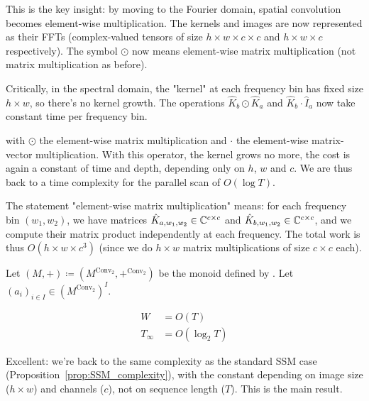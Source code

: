 \begin{ThomasAnnotation}
This is the key insight: by moving to the Fourier domain, spatial convolution becomes element-wise multiplication. The kernels and images are now represented as their FFTs (complex-valued tensors of size $h \times w \times c \times c$ and $h \times w \times c$ respectively). The symbol $\odot$ now means element-wise matrix multiplication (not matrix multiplication as before).

Critically, in the spectral domain, the "kernel" at each frequency bin has fixed size $h \times w$, so there's no kernel growth. The operations $\hat{K}_b \odot \hat{K}_a$ and $\hat{K}_b \cdot \hat{I}_a$ now take constant time per frequency bin.
\end{ThomasAnnotation}

\noindent with $\odot$ the element-wise matrix multiplication and $\cdot$ the element-wise matrix-vector multiplication. With this operator, the kernel grows no more, the cost is again a constant of time and depth, depending only on $h$, $w$ and $c$. We are thus back to a time complexity for the parallel scan of $O(\log T)$.

\begin{ThomasAnnotation}
The statement "element-wise matrix multiplication" means: for each frequency bin $(w_1, w_2)$, we have matrices $\hat{K}_{a, w_1, w_2} \in \mathbb{C}^{c \times c}$ and $\hat{K}_{b, w_1, w_2} \in \mathbb{C}^{c \times c}$, and we compute their matrix product independently at each frequency. The total work is thus $O(h \times w \times c^3)$ (since we do $h \times w$ matrix multiplications of size $c \times c$ each).
\end{ThomasAnnotation}

\begin{proposition}
\label{prop:spectral_conv_complexity}
    Let $(M, +) \coloneqq (M^{\mathrm{Conv}_2}, +^{\mathrm{Conv}_2})$ be the monoid defined by . Let $(a_i)_{i\in I}\in (M^{\mathrm{Conv}_2})^I$.

\begin{align}
    W&= O(T)\\
    T_\infty&= O(\log_2T)
\end{align}
\end{proposition}

\begin{ThomasAnnotation}
Excellent: we're back to the same complexity as the standard SSM case (Proposition~\ref{prop:SSM_complexity}), with the constant depending on image size ($h \times w$) and channels ($c$), not on sequence length ($T$). This is the main result.
\end{ThomasAnnotation}

